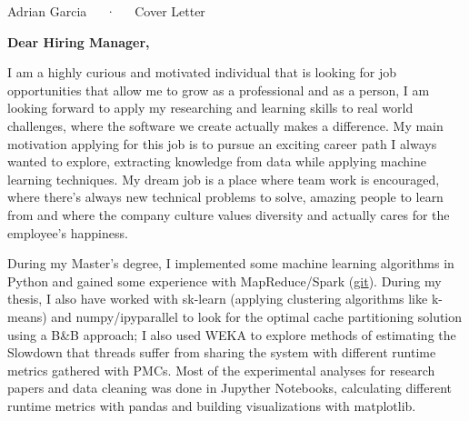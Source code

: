 \documentclass[11pt, a4paper]{awesome-cv}
\begin{document}
\makecvheader[R]

\makecvfooter
  {}
  {Adrian Garcia~~~·~~~Cover Letter}
  {}

\begin{cvletter}

\textbf{Dear Hiring Manager,}

I am a highly curious and motivated individual that is looking for job opportunities that allow me to grow as a professional and as a person, I am looking forward to apply my researching and learning skills to real world challenges, where the software we create actually makes a difference. My main motivation applying for this job is to pursue an exciting career path I always wanted to explore, extracting knowledge from data while applying machine learning techniques. My dream job is a place where team work is encouraged, where there’s always new technical problems to solve, amazing people to learn from and where the company culture values diversity and actually cares for the employee’s happiness.

During my Master’s degree, I implemented some machine learning algorithms in Python and gained some experience with MapReduce/Spark ({\color{blue}\href{https://github.com/mizadri/big-data}{git}}). During my thesis, I also have worked with sk-learn (applying clustering algorithms like k-means) and numpy/ipyparallel to look for the optimal cache partitioning solution using a B\&B approach; I also used WEKA to explore methods of estimating the Slowdown that threads suffer from sharing the system with different runtime metrics gathered with PMCs. Most of the experimental analyses for research papers and data cleaning was done in Jupyther Notebooks, calculating different runtime metrics with pandas and building visualizations with matplotlib. 

\end{cvletter}


\makeletterclosing
\end{document}
